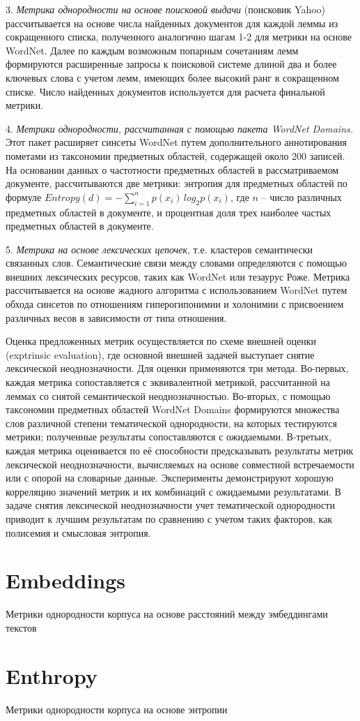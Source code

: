 3. \textit{Метрика однородности на основе поисковой выдачи} (поисковик Yahoo) рассчитывается на основе числа найденных документов для каждой леммы из сокращенного списка, полученного аналогично шагам 1-2 для метрики на основе WordNet. Далее по каждым возможным попарным сочетаниям лемм формируются расширенные запросы к поисковой системе длиной два и более ключевых слова с учетом лемм, имеющих более высокий ранг в сокращенном списке. Число найденных документов используется для расчета финальной метрики.

4. \textit{Метрики однородности, рассчитанная с помощью пакета WordNet Domains.} Этот пакет расширяет синсеты WordNet путем дополнительного аннотирования пометами из таксономии предметных областей, содержащей около 200 записей. На основании данных о частотности предметных областей в рассматриваемом документе, рассчитываются две метрики: энтропия для предметных областей по формуле $Entropy(d) = -\sum_{i = 1}^{n}p(x_i)\,log_2 p(x_i)$, где $n$ -- число различных предметных областей в документе, и процентная доля трех наиболее частых предметных областей в документе.

5. \textit{Метрика на основе лексических цепочек}, т.е. кластеров семантически связанных слов. Семантические связи между словами определяются с помощью внешних лексических ресурсов, таких как WordNet или тезаурус Роже. Метрика рассчитывается на основе жадного алгоритма с использованием WordNet путем обхода синсетов по отношениям гиперогипонимии и холонимии с присвоением различных весов в зависимости от типа отношения.

Оценка предложенных метрик осуществляется по схеме внешней оценки (exptrinsic evaluation), где основной внешней задачей выступает снятие лексической неоднозначности. Для оценки применяются три метода. Во-первых, каждая метрика сопоставляется с эквивалентной метрикой, рассчитанной на леммах со снятой семантической неоднозначностью. Во-вторых, с помощью таксономии предметных областей WordNet Domains формируются множества слов различной степени тематической однородности, на которых тестируются метрики; полученные результаты сопоставляются с ожидаемыми. В-третьих, каждая метрика оценивается по её способности предсказывать результаты метрик лексической неоднозначности, вычисляемых на основе совместной встречаемости или с опорой на словарные данные. Эксперименты демонстрируют хорошую корреляцию значений метрик и их комбинаций с ожидаемыми результатами. В задаче снятия лексической неоднозначности учет тематической однородности приводит к лучшим результатам по сравнению с учетом таких факторов, как полисемия и смысловая энтропия.




\section{Embeddings}

Метрики однородности корпуса на основе расстояний между эмбеддингами текстов

\section{Enthropy}

Метрики однородности корпуса на основе энтропии
